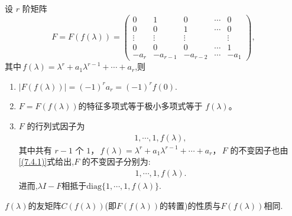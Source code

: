 \documentclass[../../main.tex]{subfiles}%
\begin{document}
\begin{lemma}[Frobenius块的基本性质]\label{lemma:Frobenius标准型矩阵的极小多项式和不变因子}
设 $r$ 阶矩阵
\[
F=F(f(\lambda)) = \begin{pmatrix}
0 & 1 & 0 & \cdots & 0 \\
0 & 0 & 1 & \cdots & 0 \\
\vdots & \vdots & \vdots & & \vdots \\
0 & 0 & 0 & \cdots & 1 \\
-a_r & -a_{r - 1} & -a_{r - 2} & \cdots & -a_1
\end{pmatrix},
\]
其中$\,f(\lambda)=\lambda^r + a_1\lambda^{r - 1}+\cdots + a_r$,则
\begin{enumerate}[(1)]
\item $|F(f(\lambda))|=(-1)^{r}a_r=(-1)^{r}f(0).$

\item $F=F(f(\lambda))$的特征多项式等于极小多项式等于 $f(\lambda)$。

\item $F$ 的行列式因子为
\begin{align}
1,\cdots,1,f(\lambda),\label{(7.4.1)}
\end{align}
其中共有 $r - 1$ 个 $1$，$\,f(\lambda)=\lambda^r + a_1\lambda^{r - 1}+\cdots + a_r$，$\,F$ 的不变因子也由\eqref{(7.4.1)}式给出,$F$ 的不变因子分别为:
\begin{align*}
1,\cdots,1,f(\lambda).
\end{align*}
进而,$\lambda I-F$相抵于$\mathrm{diag}\{1,\cdots,1,f(\lambda)\}.$
\end{enumerate}
\end{lemma}
\begin{remark}
$f(\lambda)$的友矩阵$C(f(\lambda))$(即$F(f(\lambda))$的转置)的性质与$F(f(\lambda))$相同.
\end{remark}
\end{document}
